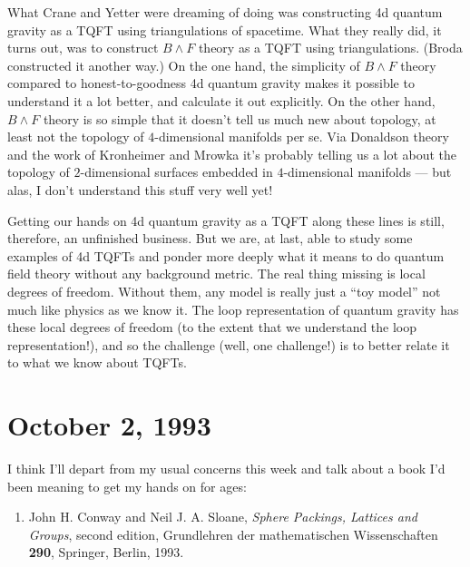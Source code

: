 \documentclass[12pt]{article}
\def\tightlist{}
\begin{document}
What Crane and Yetter were dreaming of doing was constructing 4d quantum
gravity as a TQFT using triangulations of spacetime. What they really
did, it turns out, was to construct \(B\wedge F\) theory as a TQFT using
triangulations. (Broda constructed it another way.) On the one hand, the
simplicity of \(B\wedge F\) theory compared to honest-to-goodness 4d
quantum gravity makes it possible to understand it a lot better, and
calculate it out explicitly. On the other hand, \(B\wedge F\) theory is
so simple that it doesn't tell us much new about topology, at least not
the topology of \(4\)-dimensional manifolds per se. Via Donaldson theory
and the work of Kronheimer and Mrowka it's probably telling us a lot
about the topology of \(2\)-dimensional surfaces embedded in
\(4\)-dimensional manifolds --- but alas, I don't understand this stuff
very well yet!

Getting our hands on 4d quantum gravity as a TQFT along these lines is
still, therefore, an unfinished business. But we are, at last, able to
study some examples of 4d TQFTs and ponder more deeply what it means to
do quantum field theory without any background metric. The real thing
missing is local degrees of freedom. Without them, any model is really
just a ``toy model'' not much like physics as we know it. The loop
representation of quantum gravity has these local degrees of freedom (to
the extent that we understand the loop representation!), and so the
challenge (well, one challenge!) is to better relate it to what we know
about TQFTs.



\hypertarget{week20}{%
\section{October 2, 1993}\label{week20}}

I think I'll depart from my usual concerns this week and talk about a
book I'd been meaning to get my hands on for ages:

\begin{enumerate}
\def\labelenumi{\arabic{enumi})}
\tightlist
\item
  John H. Conway and Neil J. A. Sloane, \emph{Sphere Packings, Lattices
  and Groups}, second edition, Grundlehren der mathematischen
  Wissenschaften \textbf{290}, Springer, Berlin, 1993.
\end{enumerate}
\end{document}
